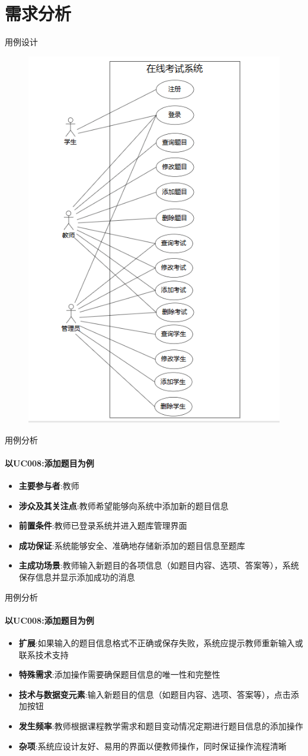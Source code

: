 \documentclass{beamer}
\begin{document}
\section{需求分析}
\begin{frame}{用例设计}
    \begin{figure}
        \centering
        \includegraphics[width=0.4\linewidth]{use-case diagram.png}
    \end{figure}
\end{frame}
\begin{frame}{用例分析}
\framesubtitle{以UC008:添加题目为例}
\begin{itemize}
    \item \textbf{主要参与者}:教师  
    \item \textbf{涉众及其关注点}:教师希望能够向系统中添加新的题目信息  
    \item \textbf{前置条件}:教师已登录系统并进入题库管理界面  
    \item \textbf{成功保证}:系统能够安全、准确地存储新添加的题目信息至题库  
    \item \textbf{主成功场景}:教师输入新题目的各项信息（如题目内容、选项、答案等），系统保存信息并显示添加成功的消息  
\end{itemize}
\end{frame}
\begin{frame}{用例分析}
\framesubtitle{以UC008:添加题目为例}
\begin{itemize}
    \item \textbf{扩展}:如果输入的题目信息格式不正确或保存失败，系统应提示教师重新输入或联系技术支持  
    \item \textbf{特殊需求}:添加操作需要确保题目信息的唯一性和完整性  
    \item \textbf{技术与数据变元素}:输入新题目的信息（如题目内容、选项、答案等），点击添加按钮  
    \item \textbf{发生频率}:教师根据课程教学需求和题目变动情况定期进行题目信息的添加操作  
    \item \textbf{杂项}:系统应设计友好、易用的界面以便教师操作，同时保证操作流程清晰
\end{itemize}
\end{frame}
\end{document}
